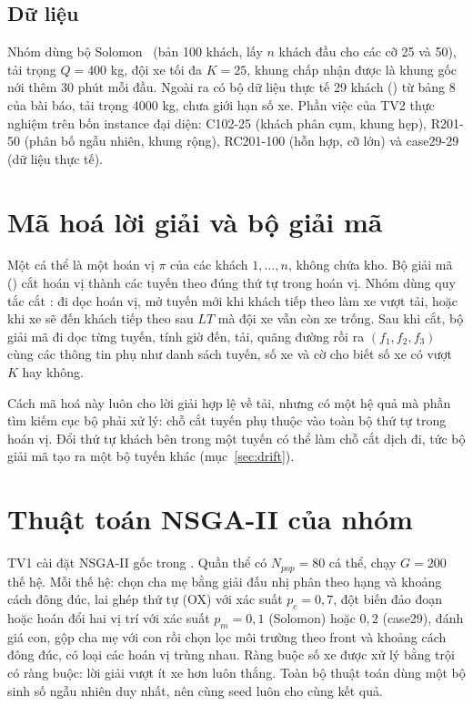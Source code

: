 \subsection{Dữ liệu}

Nhóm dùng bộ Solomon~\cite{solomon1987} (bản 100 khách, lấy $n$ khách đầu cho các cỡ 25 và 50), tải trọng $Q = 400$ kg,
đội xe tối đa $K = 25$, khung chấp nhận được là khung gốc nới thêm 30 phút mỗi đầu. Ngoài ra có bộ dữ
liệu thực tế 29 khách () từ bảng 8 của bài báo, tải trọng 4000 kg, chưa giới hạn số xe.
Phần việc của TV2 thực nghiệm trên bốn instance đại diện: C102-25 (khách phân cụm, khung hẹp), R201-50
(phân bố ngẫu nhiên, khung rộng), RC201-100 (hỗn hợp, cỡ lớn) và case29-29 (dữ liệu thực tế).

\section{Mã hoá lời giải và bộ giải mã}
\label{sec:decoder}

Một cá thể là một hoán vị $\pi$ của các khách $1,\dots,n$, không chứa kho. Bộ giải mã ()
cắt hoán vị thành các tuyến theo đúng thứ tự trong hoán vị. Nhóm dùng quy tắc cắt
: đi dọc hoán vị, mở tuyến mới khi khách tiếp theo làm xe vượt tải, hoặc khi xe sẽ
đến khách tiếp theo sau $LT$ mà đội xe vẫn còn xe trống. Sau khi cắt, bộ giải mã đi dọc từng tuyến, tính
giờ đến, tải, quãng đường rồi ra $(f_1, f_2, f_3)$ cùng các thông tin phụ như danh sách tuyến, số xe và
cờ  cho biết số xe có vượt $K$ hay không.

Cách mã hoá này luôn cho lời giải hợp lệ về tải, nhưng có một hệ quả mà phần tìm kiếm cục bộ phải xử lý:
chỗ cắt tuyến phụ thuộc vào toàn bộ thứ tự trong hoán vị. Đổi thứ tự khách bên trong một tuyến có thể
làm chỗ cắt dịch đi, tức bộ giải mã tạo ra một bộ tuyến khác (mục~\ref{sec:drift}).

\section{Thuật toán NSGA-II của nhóm}

TV1 cài đặt NSGA-II gốc trong . Quần thể có $N_{pop} = 80$ cá thể, chạy $G = 200$
thế hệ. Mỗi thế hệ: chọn cha mẹ bằng giải đấu nhị phân theo hạng và khoảng cách đông đúc, lai ghép thứ
tự (OX) với xác suất $p_c = 0{,}7$, đột biến đảo đoạn hoặc hoán đổi hai vị trí với xác suất
$p_m = 0{,}1$ (Solomon) hoặc $0{,}2$ (case29), đánh giá con, gộp cha mẹ với con rồi chọn lọc môi trường
theo front và khoảng cách đông đúc, có loại các hoán vị trùng nhau. Ràng buộc số xe được xử lý bằng trội
có ràng buộc: lời giải vượt ít xe hơn luôn thắng. Toàn bộ thuật toán dùng một bộ sinh số ngẫu nhiên
 duy nhất, nên cùng seed luôn cho cùng kết quả.

